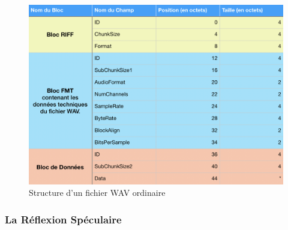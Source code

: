 \documentclass[11pt]{article}
\begin{document}
\begin{figure}[t]
    \begin{center}
        \includegraphics[scale=0.3]{wav_structure.png}
        \caption{Structure d'un fichier WAV ordinaire}
    \end{center}
\end{figure}

\newpage

\subsubsection{La Réflexion Spéculaire}
\end{document}
